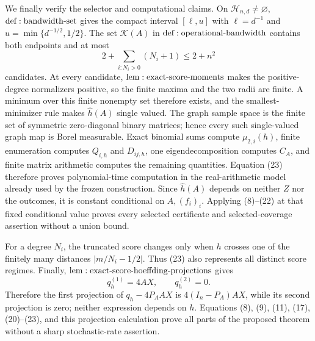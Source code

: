 We finally verify the selector and computational claims.  On \(\mathcal H_{n,d}\ne\varnothing\), \({\rm def:bandwidth\text{-}set}\) gives the compact interval \([\ell,u]\) with \(\ell=d^{-1}\) and \(u=\min\{d^{-1/2},1/2\}\).  The set \(\mathcal K(A)\) in \({\rm def:operational\text{-}bandwidth}\) contains both endpoints and at most
\[
 2+\sum_{i:N_i>0}(N_i+1)\leq2+n^2
\tag{23}
\]
candidates.  At every candidate, \({\rm lem:exact\text{-}score\text{-}moments}\) makes the positive-degree normalizers positive, so the finite maxima and the two radii are finite.  A minimum over this finite nonempty set therefore exists, and the smallest-minimizer rule makes \(\widehat h(A)\) single valued.  The graph sample space is the finite set of symmetric zero-diagonal binary matrices; hence every such single-valued graph map is Borel measurable.  Exact binomial sums compute \(\mu_{2,i}(h)\), finite enumeration computes \(Q_{i,h}\) and \(D_{ij,h}\), one eigendecomposition computes \(C_A\), and finite matrix arithmetic computes the remaining quantities.  Equation (23) therefore proves polynomial-time computation in the real-arithmetic model already used by the frozen construction.  Since \(\widehat h(A)\) depends on neither \(Z\) nor the outcomes, it is constant conditional on \(A,(f_i)_i\).  Applying (8)--(22) at that fixed conditional value proves every selected certificate and selected-coverage assertion without a union bound.

For a degree \(N_i\), the truncated score changes only when \(h\) crosses one of the finitely many distances \(|m/N_i-1/2|\).  Thus (23) also represents all distinct score regimes.  Finally, \({\rm lem:exact\text{-}score\text{-}hoeffding\text{-}projections}\) gives
\[
 q_h^{(1)}=4AX,\qquad q_h^{(2)}=0.
\]
Therefore the first projection of \(q_h-4P_AAX\) is \(4(I_n-P_A)AX\), while its second projection is zero; neither expression depends on \(h\).  Equations (8), (9), (11), (17), (20)--(23), and this projection calculation prove all parts of the proposed theorem without a sharp stochastic-rate assertion.